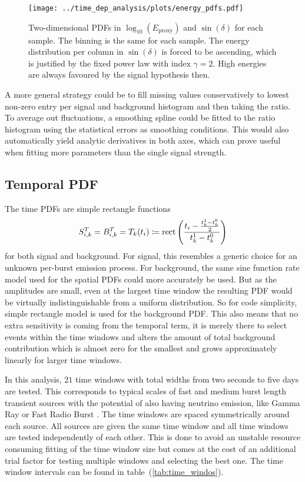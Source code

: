 \begin{figure}[htbp]
  \centering
  \texttt{[image: ../time\_dep\_analysis/plots/energy\_pdfs.pdf]}
  \caption[Energy PDFs for the time-dependent analysis]{
    Two-dimensional PDFs in $\log_{10}\left(E_\text{proxy}\right)$ and $\sin(\delta)$ for each sample.
    The binning is the same for each sample.
    The energy distribution per column in $\sin(\delta)$ is forced to be ascending, which is justified by the fixed power law with index $\gamma=2$.
    High energies are always favoured by the signal hypothesis then.
  }
  \label{fig:tdep_energy_pdfs}
\end{figure}

A more general strategy could be to fill missing values conservatively to lowest non-zero entry per signal and background histogram and then taking the ratio.
To average out fluctuations, a smoothing spline could be fitted to the ratio histogram using the statistical errors as smoothing conditions.
This would also automatically yield analytic derivatives in both axes, which can prove useful when fitting more parameters than the single signal strength.

\subsection*{Temporal PDF}
The time PDFs are simple rectangle functions
\begin{equation}
  S_{i,k}^T = B_{i,k}^T = T_k(t_i) \coloneqq
    \operatorname{rect}\left(\frac{t_i - \frac{t_k^1-t_k^0}{2}}
                              {t_k^1-t_k^0}\right)
\end{equation}
for both signal and background.
For signal, this resembles a generic choice for an unknown per-burst emission process.
For background, the same sine function rate model used for the spatial PDFs could more accurately be used.
But as the amplitudes are small, even at the largest time window the resulting PDF would be virtually indistinguishable from a uniform distribution.
So for code simplicity, simple rectangle model is used for the background PDF.
This also means that no extra sensitivity is coming from the temporal term, it is merely there to select events within the time windows and alters the amount of total background contribution which is almost zero for the smallest and grows approximately linearly for larger time windows.

In this analysis, $\num{21}$ time windows with total widths from two seconds to five days are tested.
This corresponds to typical scales of fast and medium burst length transient sources with the potential of also having neutrino emission, like Gamma Ray or Fast Radio Burst \cite{Gompertz:2017bif,Hessels:2018zvt}.
The time windows are spaced symmetrically around each source.
All sources are given the same time window and all time windows are tested independently of each other.
This is done to avoid an unstable resource consuming fitting of the time window size but comes at the cost of an additional trial factor for testing multiple windows and selecting the best one.
The time window intervals can be found in table~(\ref{tab:time_windos}).

